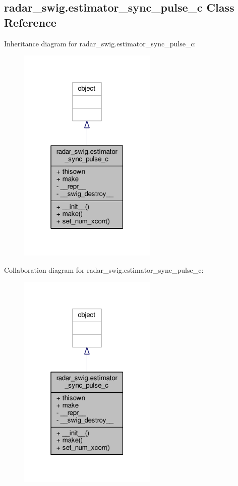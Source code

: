 \subsection{radar\+\_\+swig.\+estimator\+\_\+sync\+\_\+pulse\+\_\+c Class Reference}
\label{classradar__swig_1_1estimator__sync__pulse__c}


Inheritance diagram for radar\+\_\+swig.\+estimator\+\_\+sync\+\_\+pulse\+\_\+c\+:
\nopagebreak
\begin{figure}[H]
\begin{center}
\leavevmode
\includegraphics[width=187pt]{d1/d71/classradar__swig_1_1estimator__sync__pulse__c__inherit__graph}
\end{center}
\end{figure}


Collaboration diagram for radar\+\_\+swig.\+estimator\+\_\+sync\+\_\+pulse\+\_\+c\+:
\nopagebreak
\begin{figure}[H]
\begin{center}
\leavevmode
\includegraphics[width=187pt]{d3/d04/classradar__swig_1_1estimator__sync__pulse__c__coll__graph}
\end{center}
\end{figure}
